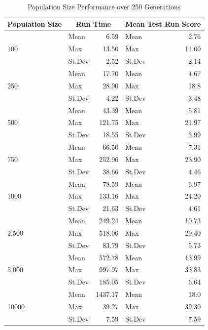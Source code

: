 \documentclass[12pt]{article}
\begin{document}
\begin{table}[ht]
\begin{center}
\begin{tabular}{|l|l|r|l|r|}
\hline%
\textbf{Population Size} & \multicolumn{2}{c|}{\textbf{Run Time}} & \multicolumn{2}{c|}{\textbf{Mean Test Run Score}} \\
\hline
\multirow{3}{*}{100}
& Mean & 6.59 & Mean & 2.76 \\
& Max & 13.50 & Max & 11.60 \\
& St.Dev & 2.52 & St.Dev & 2.14 \\
\hline
\multirow{3}{*}{250}
& Mean & 17.70 & Mean & 4.67 \\
& Max & 28.90 & Max & 18.8 \\
& St.Dev & 4.22 & St.Dev & 3.48 \\
\hline
\multirow{3}{*}{500}
& Mean & 43.39 & Mean & 5.81 \\
& Max & 121.75 & Max & 21.97 \\
& St.Dev & 18.55 & St.Dev & 3.99 \\
\hline
\multirow{3}{*}{750}
& Mean & 66.50 & Mean & 7.31 \\
& Max & 252.96 & Max & 23.90 \\
& St.Dev & 38.66 & St.Dev & 4.46 \\
\hline
\multirow{3}{*}{1000}
& Mean & 78.59 & Mean & 6.97 \\
& Max & 133.16 & Max & 24.20 \\
& St.Dev & 21.63 & St.Dev & 4.61 \\
\hline
\multirow{3}{*}{2,500}
& Mean & 249.24 & Mean & 10.73 \\
& Max & 518.06 & Max & 29.40 \\
& St.Dev & 83.79 & St.Dev & 5.73 \\
\hline
\multirow{3}{*}{5,000}
& Mean & 572.78 & Mean & 13.99 \\
& Max & 997.97 & Max & 33.83 \\
& St.Dev & 185.05 & St.Dev & 6.64 \\
\hline
\multirow{3}{*}{10000}
& Mean & 1437.17 & Mean & 18.0 \\
& Max & 39.27 & Max & 39.30 \\
& St.Dev & 7.59 & St.Dev & 7.59 \\
\hline
\end{tabular}
\end{center}
\caption{Population Size Performance over 250 Generations}
\label{table:population_size}
\end{table}
\end{document}
